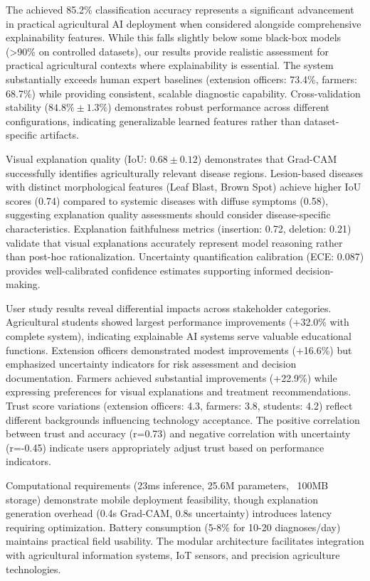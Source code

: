 \documentclass[agriculture,article,submit,pdftex,moreauthors]{Definitions/mdpi}
\begin{document}
The achieved 85.2\% classification accuracy represents a significant advancement in practical agricultural AI deployment when considered alongside comprehensive explainability features. While this falls slightly below some black-box models (>90\% on controlled datasets), our results provide realistic assessment for practical agricultural contexts where explainability is essential. The system substantially exceeds human expert baselines (extension officers: 73.4\%, farmers: 68.7\%) while providing consistent, scalable diagnostic capability. Cross-validation stability ($84.8\% \pm 1.3\%$) demonstrates robust performance across different configurations, indicating generalizable learned features rather than dataset-specific artifacts.

Visual explanation quality (IoU: $0.68 \pm 0.12$) demonstrates that Grad-CAM successfully identifies agriculturally relevant disease regions. Lesion-based diseases with distinct morphological features (Leaf Blast, Brown Spot) achieve higher IoU scores (0.74) compared to systemic diseases with diffuse symptoms (0.58), suggesting explanation quality assessments should consider disease-specific characteristics. Explanation faithfulness metrics (insertion: 0.72, deletion: 0.21) validate that visual explanations accurately represent model reasoning rather than post-hoc rationalization. Uncertainty quantification calibration (ECE: 0.087) provides well-calibrated confidence estimates supporting informed decision-making.

User study results reveal differential impacts across stakeholder categories. Agricultural students showed largest performance improvements (+32.0\% with complete system), indicating explainable AI systems serve valuable educational functions. Extension officers demonstrated modest improvements (+16.6\%) but emphasized uncertainty indicators for risk assessment and decision documentation. Farmers achieved substantial improvements (+22.9\%) while expressing preferences for visual explanations and treatment recommendations. Trust score variations (extension officers: 4.3, farmers: 3.8, students: 4.2) reflect different backgrounds influencing technology acceptance. The positive correlation between trust and accuracy (r=0.73) and negative correlation with uncertainty (r=-0.45) indicate users appropriately adjust trust based on performance indicators.

Computational requirements (23ms inference, 25.6M parameters, ~100MB storage) demonstrate mobile deployment feasibility, though explanation generation overhead (0.4s Grad-CAM, 0.8s uncertainty) introduces latency requiring optimization. Battery consumption (5-8\% for 10-20 diagnoses/day) maintains practical field usability. The modular architecture facilitates integration with agricultural information systems, IoT sensors, and precision agriculture technologies.
\end{document}
